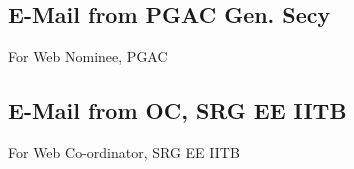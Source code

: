 \documentclass{article}
\begin{document}
	\subsection{E-Mail from PGAC Gen. Secy}
		For Web Nominee, PGAC
		\begin{figure}[h]
		\end{figure}
\newpage
	\subsection{E-Mail from OC, SRG EE IITB}
		For Web Co-ordinator, SRG EE IITB 
		\begin{figure}[h]
		\end{figure}
\newpage
\end{document}

